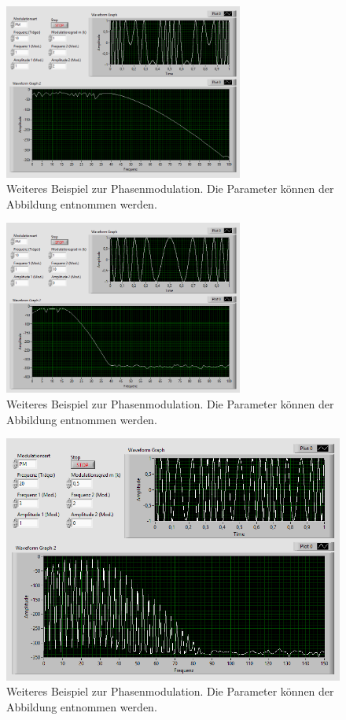 \begin{figure}[H]
	\centering
	\includegraphics[width=0.7\textwidth]{pic/t10m1-2g1.png}
	\caption{Weiteres Beispiel zur Phasenmodulation. Die Parameter können der Abbildung entnommen werden.}
	\label{fig:a10}	
\end{figure} 
\begin{figure}[H]
	\centering
	\includegraphics[width=0.7\textwidth]{pic/t10m1g1.png}
	\caption{Weiteres Beispiel zur Phasenmodulation. Die Parameter können der Abbildung entnommen werden.}
	\label{fig:a11}	
\end{figure} 

\newpage

\begin{figure}[H]
	\centering
	\includegraphics[width=1\textwidth]{pic/t20m3g05.png}
	\caption{Weiteres Beispiel zur Phasenmodulation. Die Parameter können der Abbildung entnommen werden.}
	\label{fig:a12}	
\end{figure} 
